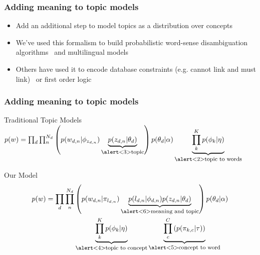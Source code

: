 \documentclass[compress]{beamer}
\newcommand{\explain}[2]{\underbrace{#2}_{\mbox{\footnotesize{#1}}}}
\begin{document}
\begin{frame}
  \frametitle{Adding meaning to topic models}

        \begin{itemize}
	 \item Add an additional step to model topics as a distribution over concepts

         \item We've used this formalism to build probabilistic word-sense
           disambiguation algorithms~\cite{boyd-graber-07} and multilingual models~\cite{boyd-graber-10}

         \item Others have used it to encode database constraints (e.g. cannot link and must link)~\cite{andrzejewski-09} or first order logic~\cite{andrzejewski-11}
        \end{itemize}

\end{frame}

\begin{frame}
  \frametitle{Adding meaning to topic models}
        \begin{block}{Traditional Topic Models}
                $ p(w) = \prod_d \prod_n^{N_d} \left( p(w_{d,n} | \phi_{z_{d,n}})
                  \explain{\alert<3>{topic}}{p(z_{d,n} | \theta_d)} \right) p(\theta_d | \alpha)                 \explain{\alert<2>{topic to words}}{ \prod_k^K
p(\phi_k | \eta) }$
        \end{block}

        \begin{block}{Our Model}
          \vspace{-0.8cm}
          \begin{align*}
               p(w) = \prod_d \prod_n^{N_d} & \left( p(w_{d,n} | \pi_{l_{d,n}})
                 \explain{\alert<6>{meaning and topic}} {p(l_{d,n} | \phi_{d,n} )
                   p(z_{d,n} | \theta_d)}  \right) p(\theta_d | \alpha) \\
               &  \explain{\alert<4>{topic to concept}}{\prod_k^K
                p(\phi_k | \eta)} \explain{\alert<5>{concept to word}}{\prod_c^C \left(
                  p(\pi_{k,c} | \tau) \right) }
           \end{align*}
        \end{block}


\end{frame}
\end{document}
